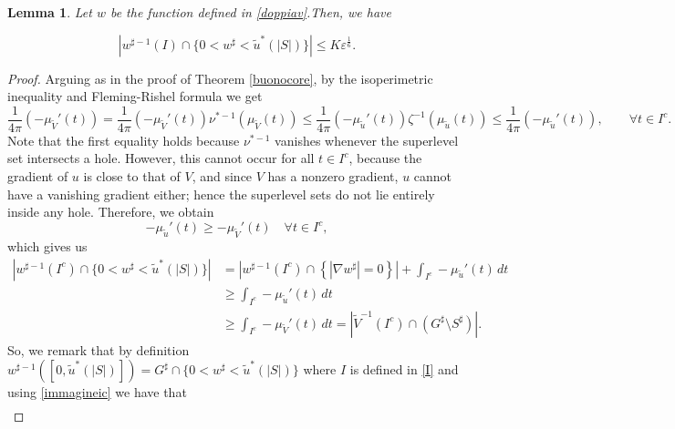 \documentclass[oneside,a4paper,11pt,notitlepage]{article}
\newcommand{\abs}[1]{{\left|#1\right|}}
\theoremstyle{definition}
\theoremstyle{plain}
\newtheorem{lemma}[theorem]{Lemma}
\theoremstyle{definition}
\begin{document}
\begin{lemma}%
    Let $w$ be the function defined in \eqref{doppiav}.Then,  we have 

\begin{equation*}
     \abs{w^{\sharp-1}(I) \cap \{0 <w^\sharp < {\tilde u}^\ast(\abs{S})\}} \leq  K \varepsilon^{\frac16}. 
\end{equation*}
\end{lemma}
\begin{proof}
    Arguing as in the proof of Theorem \ref{buonocore}, by the isoperimetric inequality and Fleming-Rishel formula we get
    \begin{equation*}
        \frac{1}{4\pi}(-\mu_{\tilde V}'(t)) =\frac{1}{4\pi}(-\mu_{\tilde V}'(t))\nu^{\ast-1}(\mu_{\tilde V}(t))\leq\frac{1}{4\pi}(-\mu_{\tilde u}'(t))\zeta^{-1}(\mu_{\tilde u}(t)) \leq \frac{1}{4\pi}(-\mu_{\tilde u}'(t)), \qquad \forall t \in I^c.
    \end{equation*}
    Note that the first equality holds because $\nu^{*-1}$ vanishes whenever the superlevel set intersects a hole. However, this cannot occur for all $t \in I^c$, because the gradient of $u$ is close to that of $V$, and since $V$ has a nonzero gradient, $u$ cannot have a vanishing gradient either; hence the superlevel sets do not lie entirely inside any hole. Therefore, we obtain
    \begin{equation*}
        -\mu_{\tilde u}'(t)\geq-\mu_{\tilde V}'(t)\quad\forall t\in I^c,
    \end{equation*}
    which gives us
    \begin{equation}\label{immagineic}
    \begin{aligned}
        \abs{w^{\sharp-1}(I^c) \cap \{0 <w^\sharp < {\tilde u}^\ast(\abs{S})\}}&=\abs{w^{\sharp-1}(I^c) \cap \left\{ \abs{ \nabla w^\sharp}=0 \right\}} + \int_{I^c}-\mu_{\tilde u}'(t)\,dt \\ &\geq \int_{I^c}-\mu_{\tilde u}'(t)\,dt\\&\geq\int_{I^c}-\mu_{\tilde V}'(t)\,dt=\abs{\tilde V^{-1}(I^c) \cap (G^\sharp\setminus S^\sharp)}.
    \end{aligned}
    \end{equation}    So,  we remark that by definition $w^{\sharp-1}([0, \tilde u ^\ast (\abs{S})])=G^\sharp\cap \{0 <w^\sharp < {\tilde u}^\ast(\abs{S})\}$ where $I$ is defined in \eqref{I} and using \eqref{immagineic} we have that
    \begin{equation*}
    \begin{aligned}

\end{aligned}
\end{equation*}
\end{proof}
\end{document}
